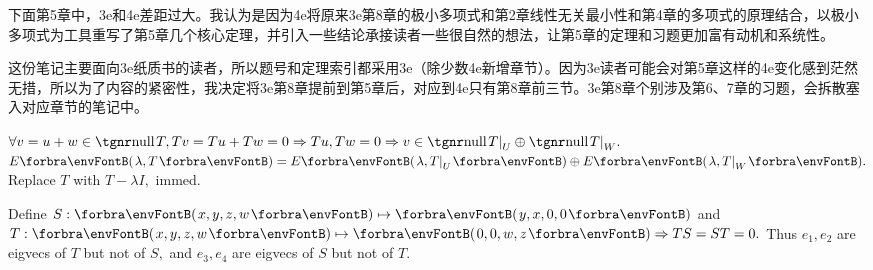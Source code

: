 {\small
下面第5章中，3e和4e差距过大。我认为是因为4e将原来3e第8章的极小多项式和第2章线性无关最小性和第4章的多项式的原理结合，以极小多项式为工具重写了第5章几个核心定理，并引入一些结论承接读者一些很自然的想法，让第5章的定理和习题更加富有动机和系统性。\par\vspace{2pt}
这份笔记主要面向3e纸质书的读者，所以题号和定理索引都采用3e（除少数4e新增章节）。因为3e读者可能会对第5章这样的4e变化感到茫然无措，所以为了内容的紧密性，我决定将3e第8章提前到第5章后，对应到4e只有第8章前三节。3e第8章个别涉及第6、\!\!7章的习题，会拆散塞入对应章节的笔记中。\par\vspace{14pt}
}\pagebreak
{}

\vspace{4pt}


$\forall v=u+w\in\null T, Tv=Tu+Tw=0\Rightarrow Tu,Tw=0\Rightarrow v\in\null T\mmid_U\oplus\null T\mmid_W.$\PfEnd
\ACoro $E\Par{\lambda,T}=E\Par{\lambda,T\mmid_U}\oplus E\Par{\lambda,T\mmid_W}.$ Replace $T$ with $T-\lambda I,$ immed.
\SepLine

\SepLine

Define $S:\Par{x,y,z,w}\mapsto\Par{y,x,0,0}$ and $T:\Par{x,y,z,w}\mapsto\Par{0,0,w,z}\Rightarrow TS=ST=0.$\parSol{}
Thus ${e_1,e_2}$ are eigvecs of $T$ but not of $S,$ and ${e_3,e_4}$ are eigvecs of $S$ but not of $T.$
\SepLine


